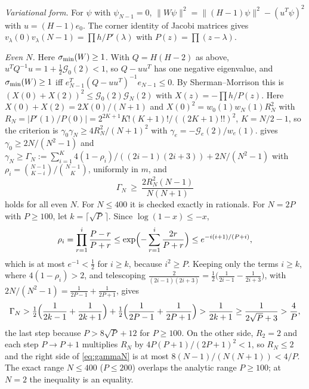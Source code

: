 \emph{Variational form.} For $\psi$ with $\psi_{N-1}=0$,
$\|W\psi\|^2=\|(H-1)\psi\|^2-(u^T\psi)^2$ with $u=(H-1)e_0$. The corner identity of Jacobi
matrices gives $v_\lambda(0)v_\lambda(N-1)=\prod h/P'(\lambda)$ with $P(z)=\prod(z-\lambda)$.

\emph{Even $N$.} Here $\sigma_{\min}(W)\ge1$. With $Q=H(H-2)$ as above, $u^TQ^{-1}u=1+\frac12\mathcal G_0(2)<1$, so
$Q-uu^T$ has one negative eigenvalue, and $\sigma_{\min}(W)\ge1$ iff $e_{N-1}^T(Q-uu^T)^{-1}e_{N-1}\le0$.
By Sherman--Morrison this is $(X(0)+X(2))^2\le \mathcal G_0(2)\mathcal G_N(2)$ with $X(z)=-\prod h/P(z)$. Here
$X(0)+X(2)=2X(0)/(N+1)$ and $X(0)^2=w_0(1)w_N(1)R_N^2$ with
$R_N=|P'(1)/P(0)|=2^{2K+1}K!(K+1)!/((2K+1)!!)^2$, $K=N/2-1$, so the criterion is
$\gamma_0\gamma_N\ge4R_N^2/(N+1)^2$ with $\gamma_e=-\mathcal G_e(2)/w_e(1)$.  gives
$\gamma_0\ge2N/(N^2-1)$ and $\gamma_N\ge\Gamma_N:=\sum_{i=1}^K4(1-\rho_i)/((2i-1)(2i+3))+2N/(N^2-1)$
with $\rho_i=\binom{N-1}{K-i}/\binom{N-1}K$, uniformly in $m$, and
\begin{equation}\label{eq:gammaN}
  \Gamma_N\ \ge\ \frac{2R_N^2(N-1)}{N(N+1)}
\end{equation}
holds for all even $N$. For $N\le400$ it is checked exactly in rationals. For $N=2P$ with
$P\ge100$, let $k=\lceil\sqrt P\,\rceil$. Since $\log(1-x)\le-x$,
\[
  \rho_i=\prod_{r=1}^i\frac{P-r}{P+r}\le\exp\Bigl(-\sum_{r=1}^i\frac{2r}{P+r}\Bigr)\le e^{-i(i+1)/(P+i)},
\]
which is at most $e^{-1}<\frac12$ for $i\ge k$, because $i^2\ge P$. Keeping only the terms
$i\ge k$, where $4(1-\rho_i)>2$, and telescoping $\frac2{(2i-1)(2i+3)}=\frac12\bigl(\frac1{2i-1}-\frac1{2i+3}\bigr)$,
with $2N/(N^2-1)=\frac1{2P-1}+\frac1{2P+1}$, gives
\[
  \Gamma_N>\tfrac12\Bigl(\frac1{2k-1}+\frac1{2k+1}\Bigr)+\tfrac12\Bigl(\frac1{2P-1}+\frac1{2P+1}\Bigr)
  >\frac1{2k+1}\ge\frac1{2\sqrt P+3}>\frac4P,
\]
the last step because $P>8\sqrt P+12$ for $P\ge100$. On the other side, $R_2=2$ and each step
$P\to P+1$ multiplies $R_N$ by $4P(P+1)/(2P+1)^2<1$, so $R_N\le2$ and the right side of
\eqref{eq:gammaN} is at most $8(N-1)/(N(N+1))<4/P$. The exact range $N\le400$ ($P\le200$)
overlaps the analytic range $P\ge100$; at $N=2$ the inequality is an equality.

